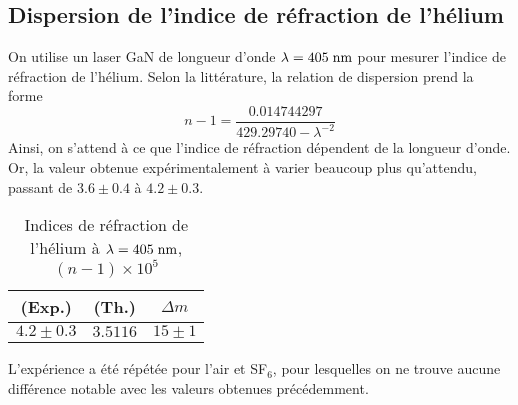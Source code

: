 \documentclass[10pt,letterpaper,twocolumn]{article}
\newcommand{\s}{\hspace{0.1cm}}
\begin{document}
\subsection{Dispersion de l'indice de réfraction de l'hélium}
On utilise un laser GaN de longueur d'onde $\lambda = 405\s \text{nm}$ pour mesurer l'indice de réfraction de l'hélium. Selon la littérature\supercite{rii}, la relation de dispersion prend la forme
\begin{equation}
	n - 1 = \frac{0.014744297}{429.29740 - \lambda^{-2}}
\end{equation}
Ainsi, on s'attend à ce que l'indice de réfraction dépendent de la longueur d'onde. Or, la valeur obtenue expérimentalement à varier beaucoup plus qu'attendu, passant de $3.6 \pm 0.4$ à $4.2 \pm 0.3$. 
\begin{table}[H]
	\centering
	\caption{Indices de réfraction de l'hélium à $\lambda = 405\s \text{nm}$,  $(n - 1)\times 10^5$ }
	\begin{tabular}{|c|c|c|}
		\hline
		  (Exp.) & (Th.)\supercite{rii} & $\Delta m$ \\\hline
		   $4.2 \pm 0.3$ &   $3.5116$  &   $15 \pm 1$   \\\hline
	\end{tabular}
\end{table}
L'expérience a été répétée pour l'air et SF$_6$, pour lesquelles on ne trouve aucune différence notable avec les valeurs obtenues précédemment. 

%
\end{document}
